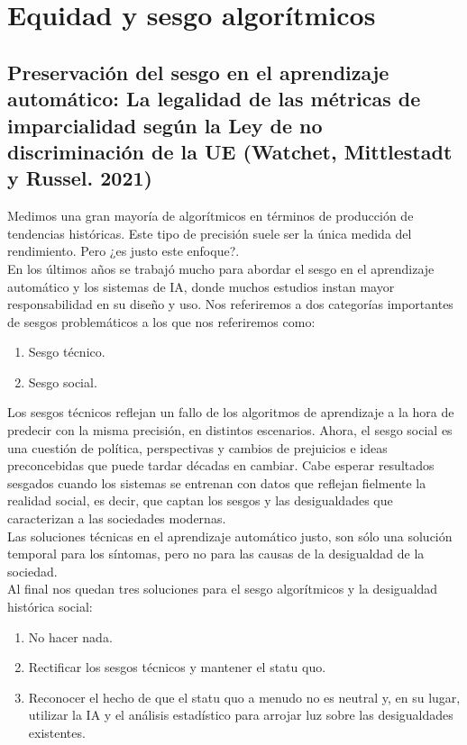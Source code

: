 \part{Equidad y sesgo algorítmicos}

\chapter{Preservación del sesgo en el aprendizaje automático: La legalidad de las métricas de imparcialidad según la Ley de no discriminación de la UE (Watchet, Mittlestadt y Russel. 2021)}
Medimos una gran mayoría de algorítmicos en términos de producción de tendencias históricas. Este tipo de precisión suele ser la única medida del rendimiento. Pero ¿es justo este enfoque?. \\

En los últimos años se trabajó mucho para abordar el sesgo en el aprendizaje automático y los sistemas de IA, donde muchos estudios instan mayor responsabilidad en su diseño y uso. Nos referiremos a dos categorías importantes de sesgos problemáticos a los que nos referiremos como:

\begin{enumerate}[1.]
    \item Sesgo técnico.
    \item Sesgo social.
\end{enumerate}

Los sesgos técnicos reflejan un fallo de los algoritmos de aprendizaje a la hora de predecir con la misma precisión, en distintos escenarios. Ahora, el sesgo social es una cuestión de política, perspectivas y cambios de prejuicios e ideas preconcebidas que puede tardar décadas en cambiar. Cabe esperar resultados sesgados cuando los sistemas se entrenan con datos que reflejan fielmente la realidad social, es decir, que captan los sesgos y las desigualdades que caracterizan a las sociedades modernas. \\

Las soluciones técnicas en el aprendizaje automático justo, son sólo una solución temporal para los síntomas, pero no para las causas de la desigualdad de la sociedad.\\

Al final nos quedan tres soluciones para el sesgo algorítmicos y la desigualdad histórica social:

\begin{enumerate}[1.]	
    \item No hacer nada.
    \item Rectificar los sesgos técnicos y mantener el statu quo.
    \item Reconocer el hecho de que el statu quo a menudo no es neutral y, en su lugar, utilizar la IA y el análisis estadístico para arrojar luz sobre las desigualdades existentes.
\end{enumerate}

